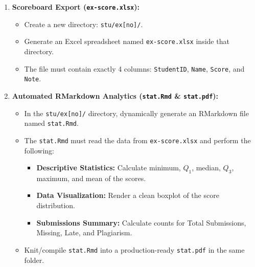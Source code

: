 \documentclass[
]{article}
\providecommand{\tightlist}{%
  \setlength{\itemsep}{0pt}\setlength{\parskip}{0pt}}
\begin{document}
\begin{enumerate}
\def\labelenumi{\arabic{enumi}.}
\tightlist
\item
  \textbf{Scoreboard Export (\texttt{ex-score.xlsx}):}

  \begin{itemize}
  \tightlist
  \item
    Create a new directory: \texttt{stu/ex{[}no{]}/}.
  \item
    Generate an Excel spreadsheet named \texttt{ex-score.xlsx} inside
    that directory.
  \item
    The file must contain exactly 4 columns: \texttt{StudentID},
    \texttt{Name}, \texttt{Score}, and \texttt{Note}.
  \end{itemize}
\item
  \textbf{Automated RMarkdown Analytics (\texttt{stat.Rmd} \&
  \texttt{stat.pdf}):}

  \begin{itemize}
  \tightlist
  \item
    In the \texttt{stu/ex{[}no{]}/} directory, dynamically generate an
    RMarkdown file named \texttt{stat.Rmd}.
  \item
    The \texttt{stat.Rmd} must read the data from \texttt{ex-score.xlsx}
    and perform the following:

    \begin{itemize}
    \tightlist
    \item
      \textbf{Descriptive Statistics:} Calculate minimum, \(Q_1\),
      median, \(Q_3\), maximum, and mean of the scores.
    \item
      \textbf{Data Visualization:} Render a clean boxplot of the score
      distribution.
    \item
      \textbf{Submissions Summary:} Calculate counts for Total
      Submissions, Missing, Late, and Plagiarism.
    \end{itemize}
  \item
    Knit/compile \texttt{stat.Rmd} into a production-ready
    \texttt{stat.pdf} in the same folder.
  \end{itemize}
\end{enumerate}
\end{document}
